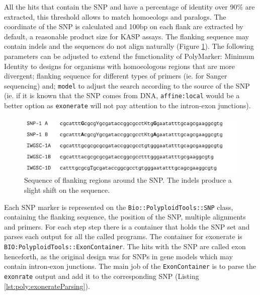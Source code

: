 All the hits that contain the SNP and have a percentage of identity over 90\% are extracted, this threshold allows to match homoeologs and paralogs. 
The coordinate of the SNP is calculated and 100bp on each flank are extracted by default, a reasonable product size for KASP assays. 
The flanking sequence may contain \acrshort{indels} and the sequences do not align naturally (Figure \ref{fig:poly:globalSequence}).
The following parameters can be adjusted to extend the functionality of PolyMarker: Minimum Identity to designs for organisms with homoeologous regions that are more divergent; flanking sequence for different types of primers (ie. for Sanger sequencing) and;  \verb|model| to adjust the search according to the source of the SNP (ie. if it is known that the SNP comes from DNA, \verb|affine:local| would be a better option as \verb|exonerate| will not pay attention to the intron-exon junctions).

\begin{figure}
\centering
\includegraphics[width=1\textwidth]{PolyMarker/Figures/aln/scaffoldsFound.pdf}
\caption[Sequence of flanking regions around the SNP.]{Sequence of flanking regions around the SNP. The \acrshort{indels} produce a slight shift on the sequence.}
\label{fig:poly:globalSequence}
\end{figure}


Each SNP marker is represented on the \verb|Bio::PolyploidTools::SNP| class, containing the flanking sequence, the position of the SNP, multiple alignments and primers. 
For each step step there is a container that holds the SNP set and parses each output for all the called programs. 
The container for exonerate is \verb|BIO:PolyploidTools::ExonContainer|. 
The hits with the SNP are called exon henceforth, as the original design was for SNPs in gene models which may contain intron-exon junctions. 
The main job of the \verb|ExonContainer| is to parse the \verb|exonrate| output and add it to the corresponding SNP (Listing \ref{lst:poly:exonerateParsing}). 

